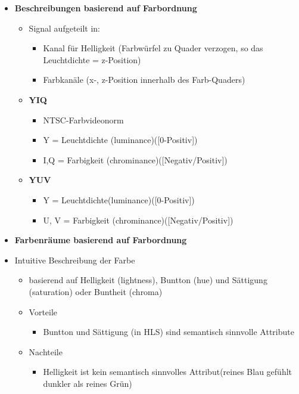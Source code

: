 \documentclass[11pt]{article}
\begin{document}
\begin{itemize}
\begin{itemize}
    \end{itemize}
    \item \textbf{Beschreibungen basierend auf Farbordnung}
    \begin{itemize}
        \item Signal aufgeteilt in:
        \begin{itemize}
            \item Kanal für Helligkeit (Farbwürfel zu Quader verzogen, so das Leuchtdichte = z-Position)
            \item Farbkanäle (x-, z-Position innerhalb des Farb-Quaders)
        \end{itemize}
        \item \textbf{YIQ}
        \begin{itemize}
            \item NTSC-Farbvideonorm
            \item Y = Leuchtdichte (luminance)([0-Positiv])
            \item I,Q = Farbigkeit (chrominance)([Negativ/Positiv])
        \end{itemize}
        \item \textbf{YUV}
        \begin{itemize}
            \item Y = Leuchtdichte(luminance)([0-Positiv])
            \item U, V =  Farbigkeit (chrominance)([Negativ/Positiv])
        \end{itemize}
    \end{itemize}
    \item \textbf{Farbenräume basierend auf Farbordnung}
        \item Intuitive Beschreibung der Farbe
        \begin{itemize}
            \item basierend auf Helligkeit (lightness), Buntton (hue) und  Sättigung (saturation) oder Buntheit (chroma)
            \item Vorteile
            \begin{itemize}
                \item Buntton und Sättigung (in HLS) sind semantisch sinnvolle Attribute
            \end{itemize}
            \item Nachteile
            \begin{itemize}
                \item Helligkeit ist kein semantisch sinnvolles Attribut(reines Blau gefühlt dunkler als reines Grün)

\end{itemize}
\end{itemize}
\end{itemize}
\end{document}
